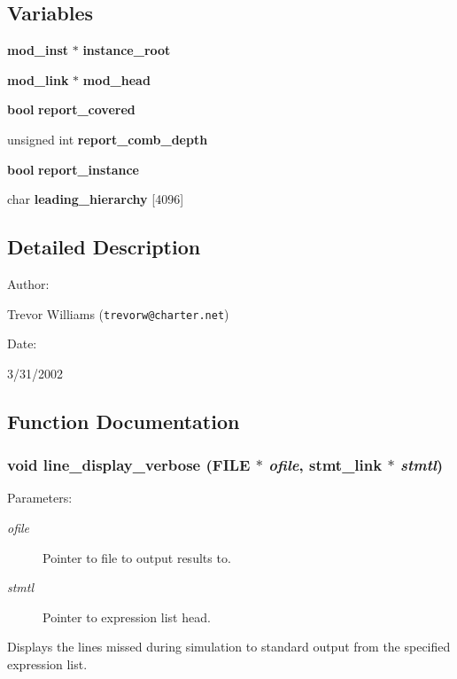 \subsection*{Variables}
\begin{CompactItemize}
\item 
{\bf mod\_\-inst} $\ast$ {\bf instance\_\-root}
\item 
{\bf mod\_\-link} $\ast$ {\bf mod\_\-head}
\item 
{\bf bool} {\bf report\_\-covered}
\item 
unsigned int {\bf report\_\-comb\_\-depth}
\item 
{\bf bool} {\bf report\_\-instance}
\item 
char {\bf leading\_\-hierarchy} [4096]
\end{CompactItemize}


\subsection{Detailed Description}


\begin{Desc}
\item[Author: ]\par
Trevor Williams ({\tt trevorw@charter.net}) \end{Desc}
\begin{Desc}
\item[Date: ]\par
3/31/2002\end{Desc}


\subsection{Function Documentation}
\subsubsection{\setlength{\rightskip}{0pt plus 5cm}void line\_\-display\_\-verbose (FILE $\ast$ {\em ofile}, {\bf stmt\_\-link} $\ast$ {\em stmtl})}\label{line_8c_a9}


\begin{Desc}
\item[Parameters: ]\par
\begin{description}
\item[{\em 
ofile}]Pointer to file to output results to. \item[{\em 
stmtl}]Pointer to expression list head.\end{description}
\end{Desc}
Displays the lines missed during simulation to standard output from the specified expression list. 
